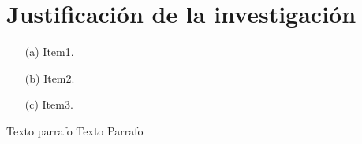 \section{Justificación de la investigación}

\begin{enumerate}
\item[(a)] Item1.
\item[(b)] Item2.
\item[(c)] Item3.
\end{enumerate}




Texto parrafo
\vskip 0.3cm
Texto Parrafo